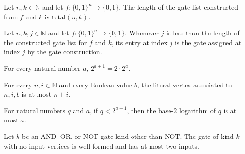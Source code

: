 \begin{theorem}
\label{BoolCircuit.Lupanov.length_gates}
\leanok
{}
Let $n,k\in\mathbb{N}$ and let $f:\{0,1\}^n\to\{0,1\}$. The length of the gate list
constructed from $f$ and $k$ is $\mathrm{total}(n,k)$.
\end{theorem}

\begin{theorem}
\label{BoolCircuit.Lupanov.getElem_gates}
\leanok
{}
Let $n,k,j\in\mathbb{N}$ and let $f:\{0,1\}^n\to\{0,1\}$. Whenever $j$ is less than the
length of the constructed gate list for $f$ and $k$, its entry at index $j$ is the gate
assigned at index $j$ by the gate construction.
\end{theorem}

\begin{theorem}
\label{BoolCircuit.Lupanov.two_pow_succ_eq}
\leanok
{}
For every natural number $a$, $2^{a+1}=2\cdot2^a$.
\end{theorem}

\begin{theorem}
\label{BoolCircuit.Lupanov.litV_le}
\leanok
{}
For every $n,i\in\mathbb{N}$ and every Boolean value $b$, the literal vertex associated
to $n,i,b$ is at most $n+i$.
\end{theorem}

\begin{theorem}
\label{BoolCircuit.Lupanov.log_le_of_lt_two_pow_succ}
\leanok
{}
For natural numbers $q$ and $a$, if $q<2^{a+1}$, then the base-$2$ logarithm of $q$ is
at most $a$.
\end{theorem}

\begin{theorem}
\label{BoolCircuit.Lupanov.nil_faninTwo}
\leanok
{}
Let $k$ be an AND, OR, or NOT gate kind other than NOT. The gate of kind $k$ with no
input vertices is well formed and has at most two inputs.
\end{theorem}

